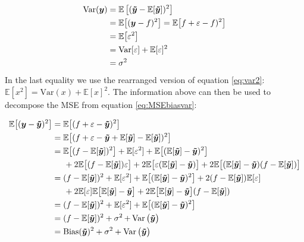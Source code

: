 \begin{align}
    \text{Var}(\boldsymbol{y}) &= \mathbb{E}\left[(\boldsymbol{\tilde{y}} - \mathbb{E}[\boldsymbol{\tilde{y}}])^2\right]\\
    &= \mathbb{E}\big[(\boldsymbol{y} - f)^2\big] = \mathbb{E}\big[f + \varepsilon - f)^2\big]\\ 
    &= \mathbb{E}\big[\varepsilon^2\big]\\
    &= \text{Var}[\varepsilon] + \mathbb{E}[\varepsilon]^2 \\
    &= \sigma^2
\end{align}
In the last equality we use the rearranged version of equation \ref{eq:var2}: $\mathbb{E}[x^2] = \text{Var}(x) + \mathbb{E}[x]^2$. The information above can then be used to decompose the MSE from equation \ref{eq:MSEbiasvar}:

\begin{align}
    \mathbb {E} {\big [}(\boldsymbol{y} - {\boldsymbol{\tilde{y}}})^{2}{\big ]}&=\mathbb {E} {\big [}(f+\varepsilon -{\boldsymbol{\tilde{y}}})^{2}{\big ]}\\
    &=\mathbb {E} {\big [}(f+\varepsilon -{\boldsymbol{\tilde{y}}}+\mathbb {E} [{\boldsymbol{\tilde{y}}}]-\mathbb {E} [{\boldsymbol{\tilde{y}}}])^{2}{\big ]}\\
    &=\mathbb {E} {\big [}(f-\mathbb {E} [{\boldsymbol{\tilde{y}}}])^{2}{\big ]}+\mathbb {E} [\varepsilon ^{2}]+\mathbb {E} {\big [}(\mathbb {E} [{\boldsymbol{\tilde{y}}}]-{\boldsymbol{\tilde{y}}})^{2}{\big ]} \\ 
    &\hspace{0.5cm}+2\mathbb {E} {\big [}(f-\mathbb {E} [{\boldsymbol{\tilde{y}}}])\varepsilon {\big ]}+2\mathbb {E} {\big [}\varepsilon (\mathbb {E} [{\boldsymbol{\tilde{y}}}]-{\boldsymbol{\tilde{y}}}){\big ]}+2\mathbb {E} {\big [}(\mathbb {E} [{\boldsymbol{\tilde{y}}}]-{\boldsymbol{\tilde{y}}})(f-\mathbb {E} [{\boldsymbol{\tilde{y}}}]){\big ]}\\
    &=(f-\mathbb {E} [{\boldsymbol{\tilde{y}}}])^{2}+\mathbb {E} [\varepsilon ^{2}]+\mathbb {E} {\big [}(\mathbb {E} [{\boldsymbol{\tilde{y}}}]-{\boldsymbol{\tilde{y}}})^{2}{\big ]}+2(f-\mathbb {E} [{\boldsymbol{\tilde{y}}}])\mathbb {E} [\varepsilon ]\\
    &\hspace{0.5cm}+2\mathbb {E} [\varepsilon ]\mathbb {E} {\big [}\mathbb {E} [{\boldsymbol{\tilde{y}}}]-{\boldsymbol{\tilde{y}}}{\big ]}+2\mathbb {E} {\big [}\mathbb {E} [{\boldsymbol{\tilde{y}}}]-{\boldsymbol{\tilde{y}}}{\big ]}(f-\mathbb {E} [{\boldsymbol{\tilde{y}}}])\\
    &=(f-\mathbb {E} [{\boldsymbol{\tilde{y}}}])^{2}+\mathbb {E} [\varepsilon ^{2}]+\mathbb {E} {\big [}(\mathbb {E} [{\boldsymbol{\tilde{y}}}]-{\boldsymbol{\tilde{y}}})^{2}{\big ]}\\
    &=(f-\mathbb {E} [{\boldsymbol{\tilde{y}}}])^{2}+\operatorname \sigma^2 +\operatorname {Var} {\big (}{\boldsymbol{\tilde{y}}}{\big )}\\
    &=\operatorname {Bias} ({\boldsymbol{\tilde{y}}})^{2}+\sigma ^{2}+\operatorname {Var} {\big (}{\boldsymbol{\tilde{y}}}{\big )}
\end{align}


